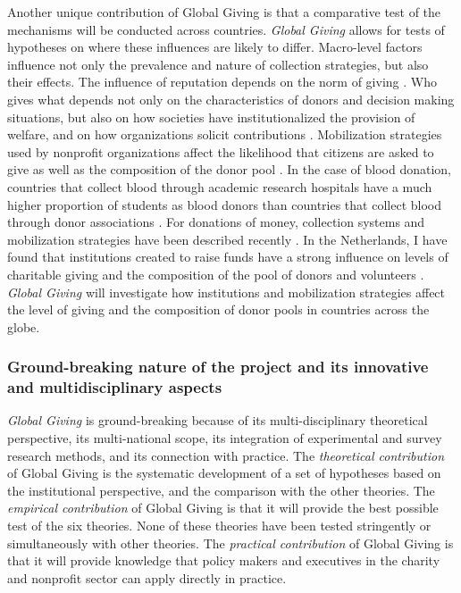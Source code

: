 \documentclass[twocolumn, serif, rga, numeric]{jote-article}
\begin{document}
Another unique contribution of Global Giving is that a comparative test of the mechanisms will be conducted across countries. \emph{Global Giving} allows for tests of hypotheses on where these influences are likely to differ. Macro-level factors influence not only the prevalence and nature of collection strategies, but also their effects. The influence of reputation depends on the norm of giving \cite{Morton2015}. Who gives what depends not only on the characteristics of donors and decision making situations, but also on how societies have institutionalized the provision of welfare, and on how organizations solicit contributions \cite{Healy2000, Healy2004}.
Mobilization strategies used by nonprofit organizations affect the likelihood that citizens are asked to give as well as the composition of the donor pool \cite{Bryant2003}. In the case of blood donation, countries that collect blood through academic research hospitals have a much higher proportion of students as blood donors than countries that collect blood through donor associations \cite{Healy2000}. For donations of money, collection systems and mobilization strategies have been described recently \cite{Breeze2015}. In the Netherlands, I have found that institutions created to raise funds have a strong influence on levels of charitable giving and the composition of the pool of donors and volunteers \cite{Bekkers2011a, Bekkers2011}. \emph{Global Giving} will investigate how institutions and mobilization strategies affect the level of giving and the composition of donor pools in countries across the globe.

 {}\subsubsection*{Ground-breaking nature of the project and its innovative and multidisciplinary aspects} 

\emph{Global Giving} is ground-breaking because of its multi-disciplinary theoretical perspective, its multi-national scope, its integration of experimental and survey research methods, and its connection with practice. The \emph{theoretical contribution} of Global Giving is the systematic development of a set of hypotheses based on the institutional perspective, and the comparison with the other theories.
The \emph{empirical contribution} of Global Giving is that it will provide the best possible test of the six theories. None of these theories have been tested stringently or simultaneously with other theories. The \emph{practical contribution} of Global Giving is that it will provide knowledge that policy makers and executives in the charity and nonprofit sector can apply directly in practice.
\end{document}
